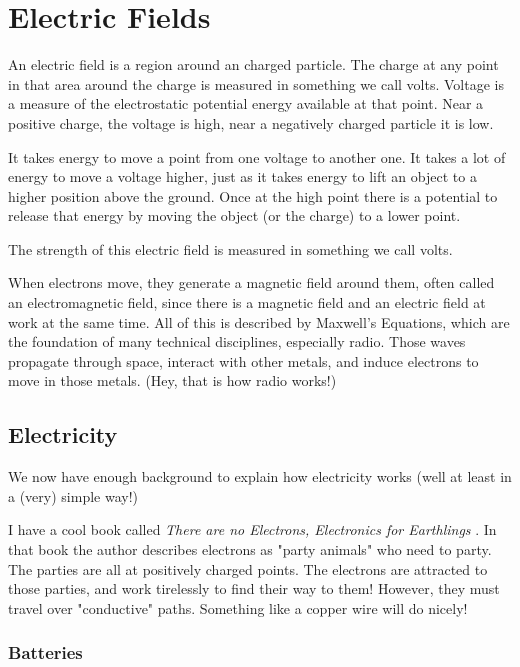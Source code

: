 \section{Electric Fields}

An electric field is a region around an charged particle. The charge at any
point in that area around the charge is measured in something we call
volts. Voltage is a measure of the electrostatic potential energy
available at that point. Near a positive charge, the voltage is high, near a
negatively charged particle it is low. 

It takes energy to move a point from one voltage to another one. It takes a lot
of energy to move a voltage higher, just as it takes energy to lift an object
to a higher position above the ground. Once at the high point there is a
potential to release that energy by moving the object (or the charge) to a
lower point. 

The strength of this electric field is measured in something we call volts.

When electrons move, they generate a magnetic field around them, often called
an electromagnetic field, since there is a magnetic field and an electric
field at work at the same time. All of this is described by Maxwell's
Equations, which are the foundation of many technical disciplines, especially
radio. Those waves propagate through space, interact with other metals, and
induce electrons to move in those metals. (Hey, that is how radio works!)

\subsection{Electricity}

We now have enough background to explain how electricity works (well at least
in a (very) simple way!)

I have a cool book called \emph{There are no Electrons, Electronics for Earthlings} \cite{Amdahl:1991}. In
that book the author describes electrons as "party animals" who need to party.
The parties are all at positively charged points. The electrons are attracted to
those parties, and work tirelessly to find their way to them! However, they
must travel over "conductive" paths. Something like a copper wire will do
nicely!

\subsubsection{Batteries}

